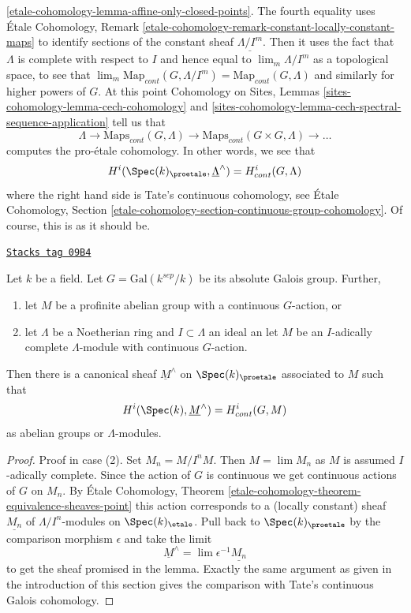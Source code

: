\ref{etale-cohomology-lemma-affine-only-closed-points}.
The fourth equality uses
\'Etale Cohomology, Remark
\ref{etale-cohomology-remark-constant-locally-constant-maps}
to identify sections of the constant sheaf $\underline{\Lambda/I^m}$.
Then it uses the fact that $\Lambda$ is complete with respect to $I$
and hence equal to $\lim_m \Lambda/I^m$ as a topological space, to see that
$\lim_m \text{Map}_{cont}(G, \Lambda/I^m) = \text{Map}_{cont}(G, \Lambda)$
and similarly for higher powers of $G$.
At this point Cohomology on Sites, Lemmas
\ref{sites-cohomology-lemma-cech-cohomology}  and
\ref{sites-cohomology-lemma-cech-spectral-sequence-application}
tell us that
$$
\Lambda \to \text{Maps}_{cont}(G, \Lambda) \to
\text{Maps}_{cont}(G \times G, \Lambda) \to \ldots
$$
computes the pro-\'etale cohomology. In other words, we see that
$$
H^i(\Spec(k)_\proetale, \underline{\Lambda}^\wedge)
=
H^i_{cont}(G, \Lambda)
$$
where the right hand side is Tate's continuous cohomology, see
\'Etale Cohomology, Section
\ref{etale-cohomology-section-continuous-group-cohomology}.
Of course, this is as it should be.

\begin{lemma}
\label{proetale-lemma-more-general-point}
\href{https://stacks.math.columbia.edu/tag/09B4}{\texttt{Stacks tag 09B4}}

Let $k$ be a field. Let $G = \text{Gal}(k^{sep}/k)$ be its absolute
Galois group. Further,
\begin{enumerate}
\item let $M$ be a profinite abelian group with a continuous
$G$-action, or
\item let $\Lambda$ be a Noetherian ring and $I \subset \Lambda$ an ideal
an let $M$ be an $I$-adically complete $\Lambda$-module with continuous
$G$-action.
\end{enumerate}
Then there is a canonical sheaf $\underline{M}^\wedge$ on
$\Spec(k)_\proetale$ associated to $M$ such that
$$
H^i(\Spec(k), \underline{M}^\wedge) = H^i_{cont}(G, M)
$$
as abelian groups or $\Lambda$-modules.
\end{lemma}

\begin{proof}
Proof in case (2). Set $M_n = M/I^nM$. Then $M = \lim M_n$ as $M$ is
assumed $I$-adically complete. Since the action of $G$ is continuous
we get continuous actions of $G$ on $M_n$. By \'Etale Cohomology, Theorem
\ref{etale-cohomology-theorem-equivalence-sheaves-point}
this action corresponds to a (locally constant) sheaf
$\underline{M_n}$ of $\Lambda/I^n$-modules on $\Spec(k)_\etale$.
Pull back to $\Spec(k)_\proetale$ by the comparison morphism
$\epsilon$ and take the limit
$$
\underline{M}^\wedge = \lim \epsilon^{-1}\underline{M_n}
$$
to get the sheaf promised in the lemma. Exactly the same argument as
given in the introduction of this section gives the comparison
with Tate's continuous Galois cohomology.
\end{proof}

